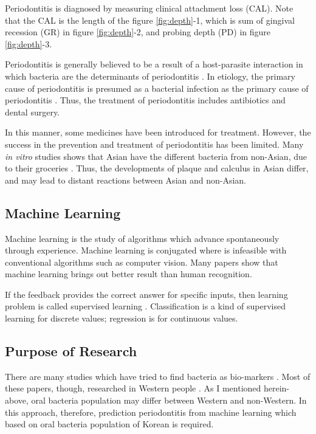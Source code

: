 \documentclass[aps, 11pt, a4paper]{article}
\begin{document}
    		Periodontitis is diagnosed by measuring clinical attachment loss (CAL). Note that the CAL is the length of the figure \ref{fig:depth}-1, which is sum of gingival recession (GR) in figure \ref{fig:depth}-2, and probing depth (PD) in figure \ref{fig:depth}-3.
    		
    		Periodontitis is generally believed to be a result of a host-parasite interaction in which bacteria are the determinants of periodontitis \cite{ref:cause1}. In etiology, the primary cause of periodontitis is presumed as a bacterial infection as the primary cause of periodontitis \cite{ref:perio1}. Thus, the treatment of periodontitis includes antibiotics and dental surgery.
    		
    		In this manner, some medicines have been introduced for treatment. However, the success in the prevention and treatment of periodontitis has been limited. Many \textit{in vitro} studies shows that Asian have the different bacteria from non-Asian, due to their groceries \cite{ref:asian1}. Thus, the developments of plaque and calculus in Asian differ, and may lead to distant reactions between Asian and non-Asian.
    		
    	\subsection{Machine Learning}
    		Machine learning is the study of algorithms which advance spontaneously through experience. Machine learning is conjugated where is infeasible with conventional algorithms such as computer vision.  Many papers show that machine learning brings out better result than human recognition. 
    	
    		If the feedback provides the correct answer for specific inputs, then learning problem is called supervised learning \cite{ref:ai1}. Classification is a kind of supervised learning for discrete values; regression is for continuous values.
    		
    	\subsection{Purpose of Research}
    		There are many studies which have tried to find bacteria as bio-markers \cite{ref:biomarker1, ref:biomarker2}. Most of these papers, though, researched in Western people \cite{ref:west1, ref:west2}. As I mentioned herein-above, oral bacteria population may differ between Western and non-Western. In this approach, therefore, prediction periodontitis from machine learning which based on oral bacteria population of Korean is required. 
    		
\end{document}
